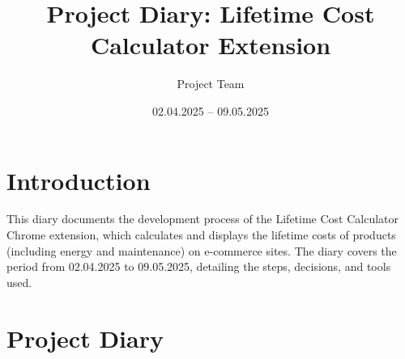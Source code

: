 \documentclass{article}
\title{Project Diary: Lifetime Cost Calculator Extension}
\author{Project Team}
\date{02.04.2025 -- 09.05.2025}
\begin{document}
\maketitle

\section*{Introduction}
This diary documents the development process of the Lifetime Cost Calculator Chrome extension, which calculates and displays the lifetime costs of products (including energy and maintenance) on e-commerce sites. The diary covers the period from 02.04.2025 to 09.05.2025, detailing the steps, decisions, and tools used.

\section*{Project Diary}
\end{document}
